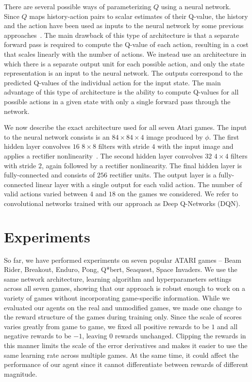 \documentclass{article} \usepackage{nips13submit_e,times}
\begin{document}
There are several possible ways of parameterizing $Q$ using a neural network.  Since $Q$ maps history-action pairs to scalar estimates of their Q-value, the history and the action have been used as inputs to the neural network by some previous approaches~\cite{riedmiller-nfq,lange:dfq}.  The main drawback of this type of architecture is that a separate forward pass is required to compute the Q-value of each action, resulting in a cost that scales linearly with the number of actions.  We instead use an architecture in which there is a separate output unit for each possible action, and only the state representation is an input to the neural network.  The outputs correspond to the predicted Q-values of the individual action for the input state.  The main advantage of this type of architecture is the ability to compute Q-values for all possible actions in a given state with only a single forward pass through the network. 

We now describe the exact architecture used for all seven Atari games.
The input to the neural network consists is an $84 \times 84 \times 4$ image produced by $\phi$.  The first hidden layer convolves $16$ $8 \times 8$ filters with stride $4$ with the input image and applies a rectifier nonlinearity~\cite{jarrett-best,nair-relu}.  The second hidden layer convolves $32$ $4\times 4$ filters with stride $2$, again followed by a rectifier nonlinearity.  The final hidden layer is fully-connected and consists of $256$ rectifier units.  The output layer is a fully-connected linear layer with a single output for each valid action.  The number of valid actions varied between $4$ and $18$ on the games we considered.  We refer to convolutional networks trained with our approach as Deep Q-Networks (DQN). 
\section{Experiments}
\label{sec:experiments}


So far, we have performed experiments on seven popular ATARI games -- Beam Rider, Breakout, Enduro, Pong, Q*bert, Seaquest, Space Invaders. We use the same network architecture, learning algorithm and hyperparameters settings across all seven games, showing that our approach is robust enough to work on a variety of games without incorporating game-specific information. While we evaluated our agents on the real and unmodified games, we made one change to the reward structure of the games during training only.  Since the scale of scores varies greatly from game to game, we fixed all positive rewards to be $1$ and all negative rewards to be $-1$, leaving $0$ rewards unchanged.  Clipping the rewards in this manner limits the scale of the error derivatives and makes it easier to use the same learning rate across multiple games.  At the same time, it could affect the performance of our agent since it cannot differentiate between rewards of different magnitude.
\end{document}
